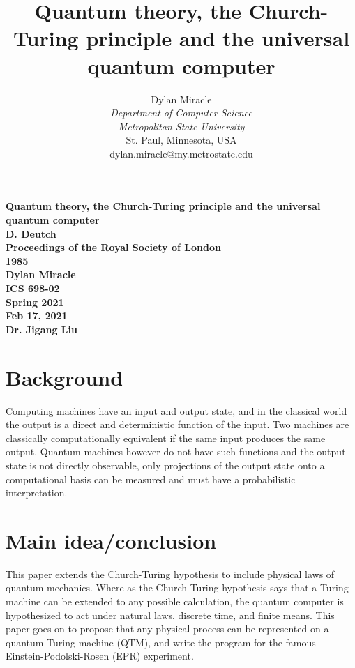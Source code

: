 \documentclass{article}
\begin{document}
\begin{titlepage}
    \begin{center}
        \vspace{4cm}
        \large
        \textbf{
            Quantum theory, the Church-Turing principle and the universal quantum computer \\
            D. Deutch \\
            Proceedings of the Royal Society of London \\
            1985 \\
            Dylan Miracle \\
            ICS 698-02 \\
            Spring 2021 \\
            Feb 17, 2021 \\
            Dr. Jigang Liu
        }
    \end{center}
\end{titlepage}
\title{Quantum theory, the Church-Turing principle and the universal quantum computer}

\author{Dylan Miracle\\
\textit{Department of Computer Science} \\
\textit{Metropolitan State University}\\
St. Paul, Minnesota, USA \\
dylan.miracle@my.metrostate.edu
}

\maketitle
\section{Background}
Computing machines have an input and output state, and in the classical world the output is a direct and deterministic function of the input. Two machines are classically computationally equivalent if the same input produces the same output. Quantum machines however do not have such functions and the output state is not directly observable, only projections of the output state onto a computational basis can be measured and must have a probabilistic interpretation.

\section{Main idea/conclusion}

This paper extends the Church-Turing hypothesis to include physical laws of quantum mechanics. Where as the Church-Turing hypothesis says that a Turing machine can be extended to any possible calculation, the quantum computer is hypothesized to act under natural laws, discrete time, and finite means. This paper goes on to propose that any physical process can be represented on a quantum Turing machine (QTM), and write the program for the famous Einstein-Podolski-Rosen (EPR) experiment.
\end{document}
